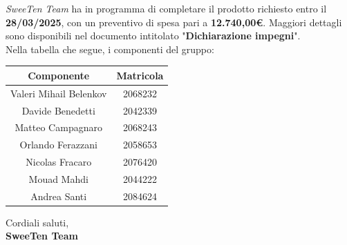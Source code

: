 \documentclass[italian, 11pt]{article}
\begin{document}
\textit{SweeTen Team} ha in programma di completare il prodotto richiesto entro il \textbf{28/03/2025}, con un preventivo di spesa pari a \textbf{12.740,00€}. Maggiori dettagli sono disponibili nel documento intitolato "\textbf{Dichiarazione impegni}".
\\Nella tabella che segue, i componenti del gruppo:
 \begin{table}[H]
    \centering
    \begin{tabular}{|c|c|}
        \hline
        \textbf{Componente} & \textbf{Matricola} \\
        \hline
        Valeri Mihail Belenkov & 2068232 \\
        Davide Benedetti 	& 2042339 \\
        Matteo Campagnaro	& 2068243 \\
        Orlando Ferazzani 	& 2058653 \\
        Nicolas Fracaro 	& 2076420 \\
        Mouad Mahdi		    & 2044222 \\ 
        Andrea Santi 	    & 2084624 \\
        \hline       
    \end{tabular}
\end{table}

Cordiali saluti, \\
\textbf{SweeTen Team}
\end{document}
